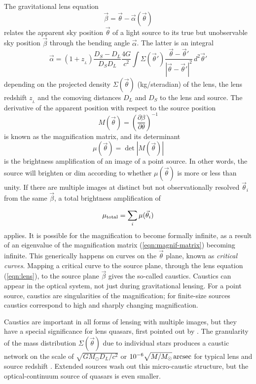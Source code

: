 \documentclass[usenatbib]{mn2e}
\begin{document}
The gravitational lens equation
\begin{equation}
\vec\beta = \vec\theta - \vec\alpha(\vec\theta)
\label{eqn:lens}
\end{equation}
relates the apparent sky position $\vec\theta$ of a light source to
its true but unobservable sky position $\vec\beta$ through the bending
angle $\vec\alpha$.  The latter is an integral 
\begin{equation}
\vec\alpha = (1+z_{_L})\frac{D_S-D_L}{D_SD_L} \frac{4G}{c^2}
\int \Sigma(\vec\theta')
\frac{\vec\theta-\vec\theta'}{|\vec\theta-\vec\theta'|^2}\,
d^2\vec\theta'
\label{eqn:alpha}
\end{equation}
depending on the projected density $\Sigma(\vec\theta)$ (kg/steradian)
of the lens, the lens redshift $z_{_L}$ and the comoving distances
$D_L$ and $D_S$ to the lens and source.  The derivative of the
apparent position with respect to the source position
\begin{equation}
M(\vec\theta) =
\left(\frac{\partial\beta}{\partial\theta}\right)^{-1}
\label{eqn:magnif-matrix}
\end{equation}
is known as the magnification matrix, and its determinant
\begin{equation}
\mu(\vec\theta) = \det|M(\vec\theta)|
\end{equation}
is the brightness amplification of an image of a point source.  In
other words, the source will brighten or dim according to whether
$\mu(\vec\theta)$ is more or less than unity.  If there are multiple
images at distinct but not observationally resolved $\vec\theta_i$ from
the same $\vec\beta$, a total brightness amplification
of

\begin{equation} \mu_{\rm total} = \sum_{i} \mu(\vec\theta_i)
\end{equation}
applies. It is possible for the magnification to become formally
infinite, as a result of an eigenvalue of the magnification matrix
(\ref{eqn:magnif-matrix}) becoming infinite.  This generically happens
on curves on the $\vec\theta$ plane, known as {\em critical curves}.
Mapping a critical curve to the source plane, through the lens
equation (\ref{eqn:lens}), to the source plane $\vec\beta$ gives the
so-called caustics.  Caustics can appear in the optical system, not just
during gravitational lensing.  For a point source, caustics are singularities
of the magnification; for finite-size sources caustics correspond to
high and sharply changing magnification.

Caustics are important in all forms of lensing with multiple images,
but they have a special significance for lens quasars, first pointed
out by \cite{1979Natur.282..561C}.  The granularity of the mass
distribution $\Sigma(\vec\theta)$ due to individual stars produces a
caustic network on the scale of $\sqrt{GM_\odot D_L/c^2}$ or $10^{-6}
\sqrt{M/M_\odot}\rm\,arcsec$ for typical lens and source redshift
\citep{2001PASA...18..207W}.  Extended sources wash out this
micro-caustic structure, but the optical-continuum source of quasars
is even smaller.
\end{document}
